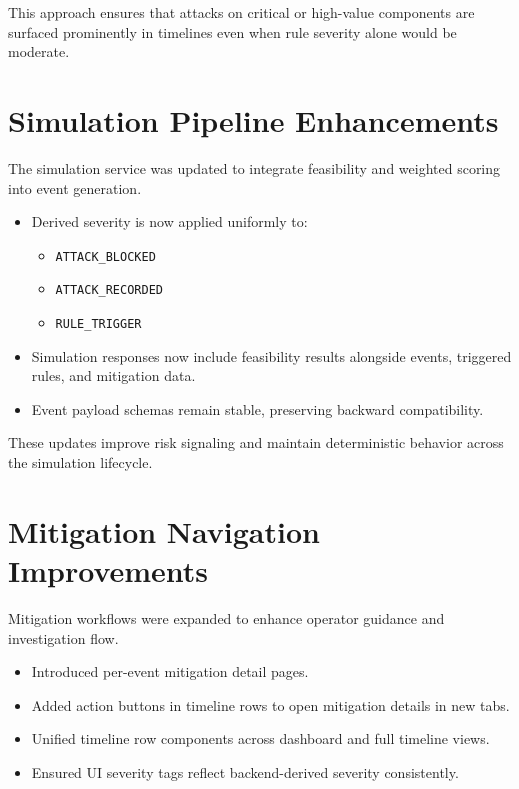 \documentclass[12pt]{article}
\begin{document}
This approach ensures that attacks on critical or high-value components are surfaced prominently in timelines even when rule severity alone would be moderate.

\section{Simulation Pipeline Enhancements}

The simulation service was updated to integrate feasibility and weighted scoring into event generation.

\begin{itemize}[leftmargin=1.5em]
\item Derived severity is now applied uniformly to:
  \begin{itemize}
  \item \texttt{ATTACK\_BLOCKED}
  \item \texttt{ATTACK\_RECORDED}
  \item \texttt{RULE\_TRIGGER}
  \end{itemize}
\item Simulation responses now include feasibility results alongside events, triggered rules, and mitigation data.
\item Event payload schemas remain stable, preserving backward compatibility.
\end{itemize}

These updates improve risk signaling and maintain deterministic behavior across the simulation lifecycle.

\section{Mitigation Navigation Improvements}

Mitigation workflows were expanded to enhance operator guidance and investigation flow.

\begin{itemize}[leftmargin=1.5em]
\item Introduced per-event mitigation detail pages.
\item Added action buttons in timeline rows to open mitigation details in new tabs.
\item Unified timeline row components across dashboard and full timeline views.
\item Ensured UI severity tags reflect backend-derived severity consistently.
\end{itemize}
\end{document}

